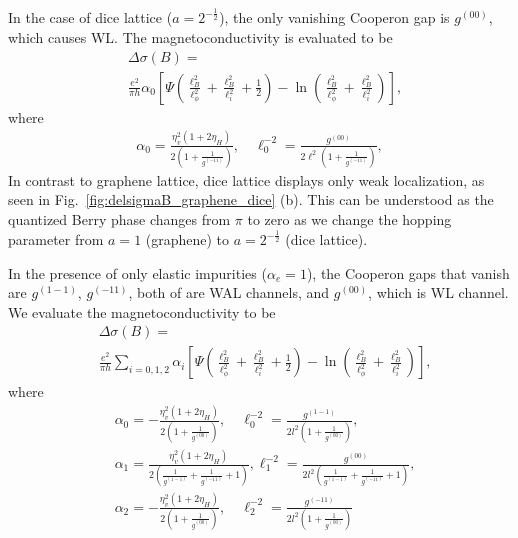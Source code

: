 \documentclass[aps,prb,amsmath,amssymb,footinbib,showpacs,twocolumn]{revtex4-2}
\begin{document}
In the case of dice lattice ($a=2^{-\frac{1}{2}}$), the only vanishing Cooperon gap is $g^{(00)}$, which causes WL. The magnetoconductivity is evaluated to be~\cite{SI}
\begin{align}
    &\Delta\sigma(B) = \nonumber \\ 
    &\frac{e^{2}}{\pi h}\alpha_{0}\left[\Psi\left(\frac{\ell^{2}_{B}}{\ell^{2}_{\phi}}+\frac{\ell^{2}_{B}}{\ell^{2}_{i}}+\frac{1}{2}\right)-\ln\left(\frac{\ell^{2}_{B}}{\ell^{2}_{\phi}}+\frac{\ell^{2}_{B}}{\ell^{2}_{i}}\right)\right],
\end{align}
where
\begin{align}
  \alpha_{0}= \frac{\eta^{2}_{v}(1+2\eta_{H})}{2\left(1+\frac{1}{g^{(-11)}}\right)}, \quad \ell^{-2}_{0} = \frac{g^{(00)}}{2\ell^{2}\left(1+\frac{1}{g^{(-11)}}\right)},    
\end{align}
In contrast to graphene lattice, dice lattice displays only weak localization, as seen in Fig.~\ref{fig:delsigmaB_graphene_dice} (b). This can be understood as the quantized Berry phase changes from $\pi$ to zero as we change the hopping parameter from $a=1$ (graphene) to $a=2^{-\frac{1}{2}}$ (dice lattice). 

In the presence of only elastic impurities ($\alpha_e=1$), the Cooperon gaps that vanish are $g^{(1-1)}$, $g^{(-11)}$, both of are WAL channels, and $g^{(00)}$, which is WL channel. We evaluate the magnetoconductivity to be~\cite{SI} 
\begin{align}
    &\Delta\sigma(B) =\nonumber \\ 
    &\frac{e^{2}}{\pi h}\sum_{i=0,1, 2}\alpha_{i}\left[\Psi\left(\frac{\ell^{2}_{B}}{\ell^{2}_{\phi}}+\frac{\ell^{2}_{B}}{\ell^{2}_{i}}+\frac{1}{2}\right)-\ln\left(\frac{\ell^{2}_{B}}{\ell^{2}_{\phi}}+\frac{\ell^{2}_{B}}{\ell^{2}_{i}}\right)\right],
\end{align}
where
\begin{align}
      &\alpha_{0}= -\frac{\eta^{2}_{v}(1+2\eta_{H})}{2\left(1+\frac{1}{g^{(00)}}\right)}, \quad \ell^{-2}_{0} = \frac{g^{(1-1)}}{2l^{2}\left(1+\frac{1}{g^{(00)}}\right)}, \nonumber\\
     &\alpha_{1}= \frac{\eta^{2}_{v}(1+2\eta_{H})}{2\left(\frac{1}{g^{(1-1)}}+\frac{1}{g^{(-11)}}+1\right)},  \ell^{-2}_{1} = \frac{g^{(00)}}{2l^{2}\left(\frac{1}{g^{(1-1)}}+\frac{1}{g^{(-11)}}+1\right)},\nonumber\\
      &\alpha_{2}= -\frac{\eta^{2}_{v}(1+2\eta_{H})}{2\left(1+\frac{1}{g^{(00)}}\right)}, \quad \ell^{-2}_{2} = \frac{g^{(-11)}}{2l^{2}\left(1+\frac{1}{g^{(00)}}\right)} 
\end{align}
\end{document}
